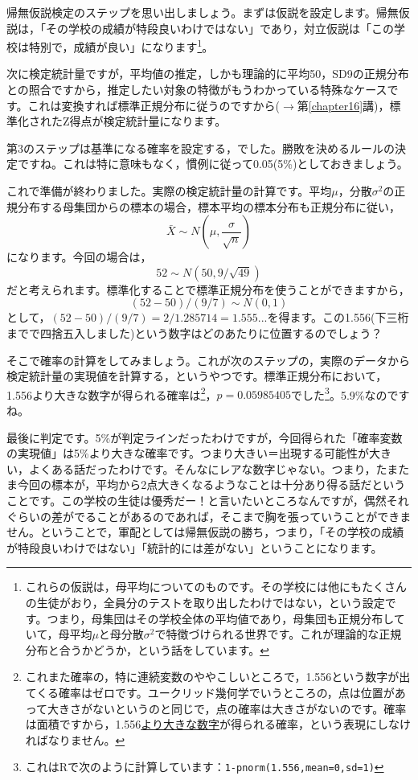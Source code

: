 \documentclass{ltjsarticle}
\begin{document}
帰無仮説検定のステップを思い出しましょう。まずは仮説を設定します。帰無仮説は，「その学校の成績が特段良いわけではない」であり，対立仮説は「この学校は特別で，成績が良い」になります\footnote{これらの仮説は，母平均についてのものです。その学校には他にもたくさんの生徒がおり，全員分のテストを取り出したわけではない，という設定です。つまり，母集団はその学校全体の平均値であり，母集団も正規分布していて，母平均$\mu$と母分散$\sigma^2$で特徴づけられる世界です。これが理論的な正規分布と合うかどうか，という話をしています。}。

次に検定統計量ですが，平均値の推定，しかも理論的に平均50，SD9の正規分布との照合ですから，推定したい対象の特徴がもうわかっている特殊なケースです。これは変換すれば標準正規分布に従うのですから($\to$第\ref{chapter16}講)，標準化されたZ得点が検定統計量になります。

第3のステップは基準になる確率を設定する，でした。勝敗を決めるルールの決定ですね。これは特に意味もなく，慣例に従って0.05(5\%)としておきましょう。

これで準備が終わりました。実際の検定統計量の計算です。平均$\mu$，分散$\sigma^2$の正規分布する母集団からの標本の場合，標本平均の標本分布も正規分布に従い，
$$ \bar{X} \sim N(\mu,\frac{\sigma}{\sqrt{n}}) $$
になります。今回の場合は，
$$ 52 \sim N(50,9/\sqrt{49}) $$
だと考えられます。標準化することで標準正規分布を使うことができますから，
$$ (52-50)/(9/7) \sim N(0,1) $$
として，$ (52-50)/(9/7) =2/1.285714=1.555... $を得ます。この1.556(下三桁までで四捨五入しました)という数字はどのあたりに位置するのでしょう？

そこで確率の計算をしてみましょう。これが次のステップの，実際のデータから検定統計量の実現値を計算する，というやつです。標準正規分布において，1.556より大きな数字が得られる確率は\footnote{これまた確率の，特に連続変数のややこしいところで，1.556という数字が出てくる確率はゼロです。ユークリッド幾何学でいうところの，点は位置があって大きさがないというのと同じで，点の確率は大きさがないのです。確率は面積ですから，1.556\underline{より大きな数字}が得られる確率，という表現にしなければなりません。}，$p=0.05985405$でした\footnote{これはRで次のように計算しています：\texttt{1-pnorm(1.556,mean=0,sd=1)}}。5.9\%なのですね。

最後に判定です。5\%が判定ラインだったわけですが，今回得られた「確率変数の実現値」は5\%より大きな確率です。つまり大きい＝出現する可能性が大きい，よくある話だったわけです。そんなにレアな数字じゃない。つまり，たまたま今回の標本が，平均から2点大きくなるようなことは十分あり得る話だということです。この学校の生徒は優秀だー！と言いたいところなんですが，偶然それぐらいの差がでることがあるのであれば，そこまで胸を張っていうことができません。ということで，軍配としては帰無仮説の勝ち，つまり，「その学校の成績が特段良いわけではない」「統計的には差がない」ということになります。
\end{document}
